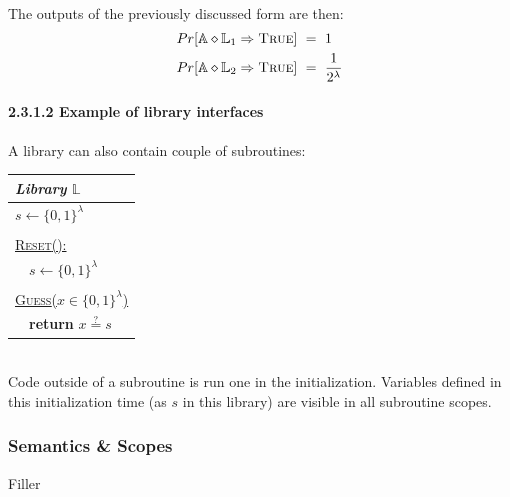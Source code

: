 \documentclass{article}
\begin{document}
\begin{adjustwidth}{2em}{}
\begin{adjustwidth}{2em}{}
\begin{adjustwidth}{2em}{4em}
\begin{adjustwidth}{2em}{}
\begin{center}
\begin{tabular}{|l|}
								\hline							
							\end{tabular}
						\end{center}
						\hfill \\
						The outputs of the previously discussed form are then:
						\begin{align*}
							Pr[\mathbb{A} \diamond \mathbb{L}_1 \Rightarrow \textsc{True}] \ & = \ 1 \\
							Pr[\mathbb{A} \diamond \mathbb{L}_2 \Rightarrow \textsc{True}] \ & = \ \frac{1}{2^{\lambda}}
						\end{align*}						
					\end{adjustwidth}
					\paragraph{2.3.1.2 Example of library interfaces}
					\begin{adjustwidth}{2em}{}
						A library can also contain couple of subroutines: \\
						\begin{center}
							\begin{tabular}{|l|}
								\hline
								\cellcolor{gray!80} \textbf{\textit{Library}} $\mathbb{L}$ \\
								\hline
								$s \leftarrow \{ 0,1 \}^{\lambda}$ \\
								\\
								\underline{\textsc{Reset}():} \\
								\ \ $s \leftarrow \{ 0,1 \}^{\lambda}$ \\
								\\
								\underline{\textsc{Guess}($x \in \{ 0,1 \}^{\lambda}$)} \\
								\ \ \textbf{return} $x \stackrel{?}{=} s$ \\
								\hline							
							\end{tabular}
						\end{center}
						\hfill \\
						Code outside of a subroutine is run one in the initialization. Variables defined in this initialization time (as $s$ in this library) are visible in all subroutine scopes.
					\end{adjustwidth}
				\end{adjustwidth}
				\subsubsection{Semantics \& Scopes}
				\begin{adjustwidth}{2em}{4em}
				Filler
				\end{adjustwidth}

\end{adjustwidth}
\end{adjustwidth}
\end{document}
